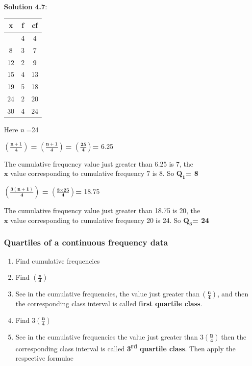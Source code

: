 \documentclass[
]{book}
\begin{document}
\textbf{Solution 4.7}:

\begin{longtable}[]{@{}ccc@{}}
\toprule\noalign{}
x & f & cf \\
\midrule\noalign{}
\endhead
\bottomrule\noalign{}
\endlastfoot
5 & 4 & 4 \\
8 & 3 & 7 \\
12 & 2 & 9 \\
15 & 4 & 13 \\
19 & 5 & 18 \\
24 & 2 & 20 \\
30 & 4 & 24 \\
\end{longtable}

Here \emph{n} =24

\(\left( \frac{\mathbf{n + 1}}{\mathbf{4}} \right)\) \textbf{=}
\(\left( \frac{\mathbf{n + 1}}{\mathbf{4}} \right)\mathbf{\ }\)\textbf{=}
\(\left( \frac{\mathbf{25}}{\mathbf{4}} \right)\)\textbf{=} 6.25

The cumulative frequency value just greater than 6.25 is 7, the\\
\(\mathbf{x}\) value corresponding to cumulative frequency 7 is 8. So
\(\mathbf{Q}_{\mathbf{1}}\)\textbf{= 8}

\(\left( \frac{\mathbf{3(n + 1)}}{\mathbf{4}} \right)\) \textbf{=}
\(\left( \frac{\mathbf{3}\mathbf{\times}\mathbf{25}}{\mathbf{4}} \right)\)\textbf{=}
18.75

The cumulative frequency value just greater than 18.75 is 20, the\\
\(\mathbf{x}\) value corresponding to cumulative frequency 20 is 24. So
\(\mathbf{Q}_{\mathbf{3}}\)\textbf{= 24}

\subsubsection{Quartiles of a continuous frequency data}\label{quartiles-of-a-continuous-frequency-data}

\begin{enumerate}
\def\labelenumi{\arabic{enumi}.}
\item
  Find cumulative frequencies
\item
  Find \(\left( \frac{\mathbf{n}}{\mathbf{4}} \right)\)
\item
  See in the cumulative frequencies, the value just greater
  than\(\ \left( \frac{\mathbf{n}}{\mathbf{4}} \right)\), and then the
  corresponding class interval is called \textbf{first quartile class}.
\item
  Find \(3\left( \frac{\mathbf{n}}{\mathbf{4}} \right)\)
\item
  See in the cumulative frequencies the value just greater than
  \(3\left( \frac{\mathbf{n}}{\mathbf{4}} \right)\mathbf{\ }\)then the
  corresponding class interval is called \textbf{3\textsuperscript{rd} quartile class}.
  Then apply the respective formulae
\end{enumerate}
\end{document}
